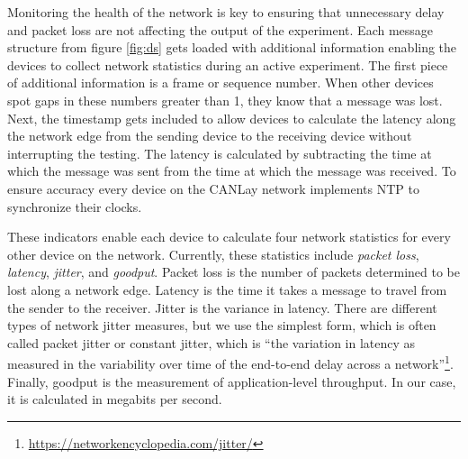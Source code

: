 \documentclass[letterpaper,twocolumn,12pt]{article}
\begin{document}
Monitoring the health of the network is key to ensuring that unnecessary delay and packet loss are not affecting the output of the experiment. 
Each message structure from figure \ref{fig:ds} gets loaded with additional information enabling the devices to collect network statistics during an active experiment. 
The first piece of additional information is a frame or sequence number. When other devices spot gaps in these numbers greater than 1, they know that a message was lost.
Next, the timestamp gets included to allow devices to calculate the latency along the network edge from the sending device to the receiving device without interrupting the testing.
The latency is calculated by subtracting the time at which the message was sent from the time at which the message was received. To ensure accuracy every device on the CANLay network implements NTP to synchronize their clocks.

These indicators enable each device to calculate four network statistics for every other device on the network. Currently, these statistics include \emph{packet loss}, \emph{latency}, \emph{jitter}, and \emph{goodput}. Packet loss is the number of packets determined to be lost along a network edge. Latency is the time it takes a message to travel from the sender to the receiver. Jitter is the variance in latency. There are different types of network jitter measures, but we use the simplest form, which is often called packet jitter or constant jitter, which is “the variation in latency as measured in the variability over time of the end-to-end delay across a network”\footnote{\url{https://networkencyclopedia.com/jitter/}}. Finally, goodput is the measurement of application-level throughput. In our case, it is calculated in megabits per second.
\end{document}
